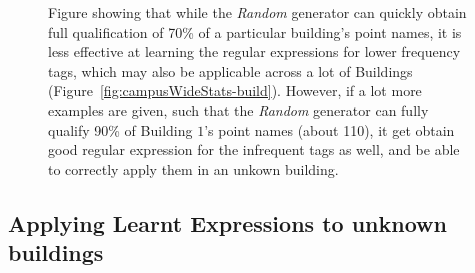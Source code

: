 \begin{figure}[ht!]
\caption{Figure showing that while the {\it Random} generator can quickly obtain full qualification of 70\% of a particular building's point names, it is less effective at learning the regular expressions for lower frequency tags, which may also be applicable across a lot of Buildings (Figure~\ref{fig:campusWideStats-build}). However, if a lot more examples are given, such that the {\it Random} generator can fully qualify 90\% of Building $1$'s point names (about 110), it get obtain good regular expression for the infrequent tags as well, and be able to correctly apply them in an unkown building.}
\label{fig:recallCampuswide}
\end{figure}


\subsection{Applying Learnt Expressions to unknown buildings}




%
%  




